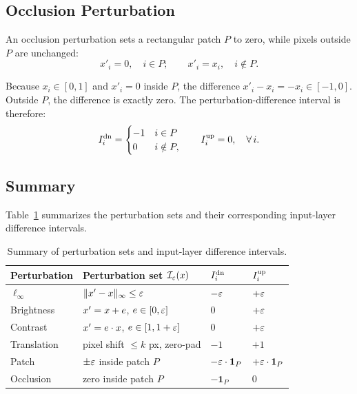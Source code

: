 \subsection{Occlusion Perturbation}

An occlusion perturbation sets a rectangular patch $P$ to zero, while pixels outside $P$ are unchanged:
\[
  x'_i = 0, \quad i \in P; \qquad x'_i = x_i, \quad i \notin P.
\]

Because $x_i \in [0,1]$ and $x'_i = 0$ inside $P$, the difference $x'_i - x_i = -x_i \in [-1, 0]$. Outside $P$, the difference is exactly zero. The perturbation-difference interval is therefore:
\[
  I^{\mathrm{dn}}_i = \begin{cases}-1 & i \in P \\ 0 & i \notin P,\end{cases}
  \qquad
  I^{\mathrm{up}}_i = 0, \quad \forall\, i.
\]

\subsection{Summary}

Table~\ref{tab:perturbations} summarizes the perturbation sets and their corresponding input-layer difference intervals.

\begin{table}[ht]
  \centering
  \caption{Summary of perturbation sets and input-layer difference intervals.}
  \label{tab:perturbations}
  \begin{tabular}{llll}
    \toprule
    \textbf{Perturbation} & \textbf{Perturbation set} $\mathcal{I}_\varepsilon(x)$ &
    $I^{\mathrm{dn}}_i$ & $I^{\mathrm{up}}_i$ \\
    \midrule
    $\ell_\infty$    & $\|x'-x\|_\infty \le \varepsilon$      & $-\varepsilon$ & $+\varepsilon$ \\
    Brightness       & $x' = x + e$, $e\in[0,\varepsilon]$    & $0$    & $+\varepsilon$ \\
    Contrast         & $x' = e\cdot x$, $e\in[1,1+\varepsilon]$ & $0$ & $+\varepsilon$ \\
    Translation      & pixel shift $\le k$ px, zero-pad & $-1$ & $+1$ \\
    Patch            & $\pm\varepsilon$ inside patch $P$
                     & $-\varepsilon \cdot \mathbf{1}_P$ & $+\varepsilon \cdot \mathbf{1}_P$ \\
    Occlusion        & zero inside patch $P$
                     & $-\mathbf{1}_P$ & $0$ \\
    \bottomrule
  \end{tabular}
\end{table}
